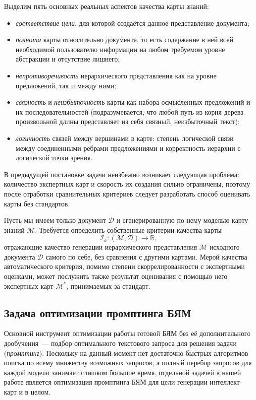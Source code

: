 \documentclass[12pt]{article}
\newcommand{\D}{\mathcal{D}}
\newcommand{\M}{\mathcal{M}}
\newcommand{\I}{\mathcal{I}}
\newcommand{\R}{\mathbb{R}}
\begin{document}
Выделим пять основных реальных аспектов качества карты знаний:
\begin{itemize}
    \item \textit{соответствие цели}, для которой создаётся данное представление документа;
    \item \textit{полнота} карты относительно документа, то есть содержание в ней всей необходимой пользователю информации на любом требуемом уровне абстракции и отсутствие лишнего;
    \item \textit{непротиворечивость} иерархического представления как на уровне предложений, так и между ними;
    \item \textit{связность} и \textit{неизбыточность} карты как набора осмысленных предложений и их последовательностей (подразумевается, что любой путь из корня дерева произвольной длины представляет из себя связный, неизбыточный текст);
    \item \textit{логичность} связей между вершинами в карте: степень логической связи между соединенными ребрами предложениями и корректность иерархии с логической точки зрения. 
\end{itemize}

В предыдущей постановке задачи неизбежно возникает следующая проблема: количество экспертных карт и скорость их создания сильно ограничены, поэтому после отработки сравнительных критериев следует разработать способ оценивать карты без стандартов. 

Пусть мы имеем только документ $\D$ и сгенерированную по нему моделью карту знаний $\M$. Требуется определить собственные критерии качества карты
$$\I_k: (\M, \D) \rightarrow \R,$$ 
отражающие качество генерации иерархического представления $\M$ исходного документа $\D$ самого по себе, без сравнения с другими картами. Мерой качества автоматического критерия, помимо степени скоррелированности с экспертными оценками, может послужить также результат оценивания с помощью него экспертных карт $\M^*$, принимаемых за стандарт.

\subsection{Задача оптимизации промптинга БЯМ}
Основной инструмент оптимизации работы готовой БЯМ без её дополнительного дообучения~--- подбор оптимального текстового запроса для решения задачи (\textit{промптинг}). Поскольку на данный момент нет достаточно быстрых алгоритмов поиска по всему множеству возможных запросов, а полный перебор запросов для каждой модели занимает слишком большое время, отдельной задачей в нашей работе является оптимизация промптинга БЯМ для цели генерации интеллект-карт и в целом.
\end{document}
